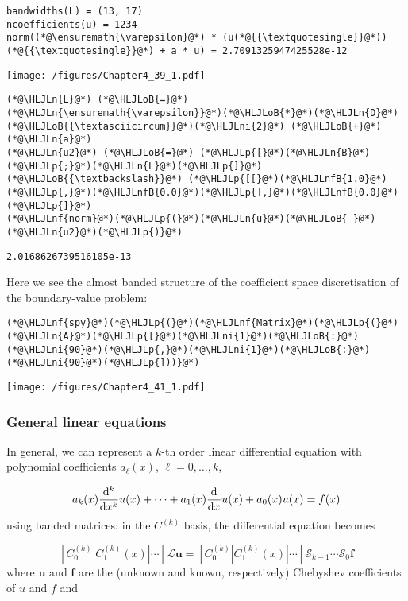 \documentclass[12pt,landscape]{article}
\newcommand{\HLJLn}[1]{#1}
\newcommand{\HLJLnf}[1]{\textcolor[RGB]{66,102,213}{#1}}
\newcommand{\HLJLnfB}[1]{\textcolor[RGB]{59,151,46}{#1}}
\newcommand{\HLJLni}[1]{\textcolor[RGB]{59,151,46}{#1}}
\newcommand{\HLJLoB}[1]{\textcolor[RGB]{102,102,102}{\textbf{#1}}}
\newcommand{\HLJLp}[1]{#1}
\begin{document}
{\begin{lstlisting}
bandwidths(L) = (13, 17)
ncoefficients(u) = 1234
norm((*@\ensuremath{\varepsilon}@*) * (u(*@{{\textquotesingle}}@*))(*@{{\textquotesingle}}@*) + a * u) = 2.7091325947425528e-12
\end{lstlisting}

\texttt{[image: /figures/Chapter4\_39\_1.pdf]}

\begin{lstlisting}
(*@\HLJLn{L}@*) (*@\HLJLoB{=}@*) (*@\HLJLn{\ensuremath{\varepsilon}}@*)(*@\HLJLoB{*}@*)(*@\HLJLn{D}@*)(*@\HLJLoB{{\textasciicircum}}@*)(*@\HLJLni{2}@*) (*@\HLJLoB{+}@*) (*@\HLJLn{a}@*)
(*@\HLJLn{u2}@*) (*@\HLJLoB{=}@*) (*@\HLJLp{[}@*)(*@\HLJLn{B}@*)(*@\HLJLp{;}@*)(*@\HLJLn{L}@*)(*@\HLJLp{]}@*) (*@\HLJLoB{{\textbackslash}}@*) (*@\HLJLp{[[}@*)(*@\HLJLnfB{1.0}@*)(*@\HLJLp{,}@*)(*@\HLJLnfB{0.0}@*)(*@\HLJLp{],}@*)(*@\HLJLnfB{0.0}@*)(*@\HLJLp{]}@*)
(*@\HLJLnf{norm}@*)(*@\HLJLp{(}@*)(*@\HLJLn{u}@*)(*@\HLJLoB{-}@*)(*@\HLJLn{u2}@*)(*@\HLJLp{)}@*)
\end{lstlisting}

\begin{lstlisting}
2.0168626739516105e-13
\end{lstlisting}


Here we see the almost banded structure of the coefficient space discretisation of the boundary-value problem:


\begin{lstlisting}
(*@\HLJLnf{spy}@*)(*@\HLJLp{(}@*)(*@\HLJLnf{Matrix}@*)(*@\HLJLp{(}@*)(*@\HLJLn{A}@*)(*@\HLJLp{[}@*)(*@\HLJLni{1}@*)(*@\HLJLoB{:}@*)(*@\HLJLni{90}@*)(*@\HLJLp{,}@*)(*@\HLJLni{1}@*)(*@\HLJLoB{:}@*)(*@\HLJLni{90}@*)(*@\HLJLp{]))}@*)
\end{lstlisting}

\texttt{[image: /figures/Chapter4\_41\_1.pdf]}

\subsubsection{General linear equations}
In general, we can represent a $k$-th order linear differential equation with polynomial coefficients $a_{\ell}(x)$, $\ell = 0, \ldots, k$, 

\[
a_k(x)\frac{{\rm d}^k}{{\rm d}x^k}u(x) + \cdots + a_1(x)\frac{{\rm d}}{{\rm d}x}u(x) + a_0(x)u(x) = f(x)
\]
using banded matrices: in the $C^{(k)}$ basis, the differential equation becomes

\[
\left[ C_0^{(k)} | C_1^{(k)}(x) | \cdots    \right]\mathcal{L}\mathbf{u} = \left[ C_0^{(k)} | C_1^{(k)}(x) | \cdots    \right]\mathcal{S}_{k-1}\cdots\mathcal{S}_0\mathbf{f}
\]
where $\mathbf{u}$ and $\mathbf{f}$ are the (unknown and known, respectively) Chebyshev coefficients of $u$ and $f$ and 

}
\end{document}
